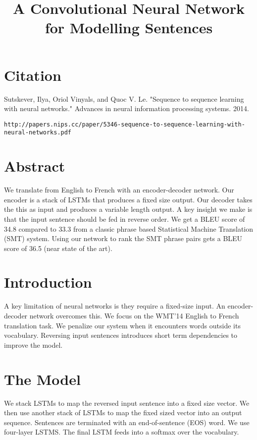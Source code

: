 \documentclass[a4paper]{article}
\title{A Convolutional Neural Network for Modelling Sentences}
\date{}
\begin{document}
\maketitle

\section{Citation}
Sutskever, Ilya, Oriol Vinyals, and Quoc V. Le. "Sequence to sequence learning with neural networks." Advances in neural information processing systems. 2014.

\begin{verbatim}
http://papers.nips.cc/paper/5346-sequence-to-sequence-learning-with-neural-networks.pdf
\end{verbatim}

\section{Abstract}
We translate from English to French with an encoder-decoder network. Our encoder
is a stack of LSTMs that produces a fixed size output. Our decoder takes
the this as input and produces a variable length output. A key insight we
make is that the input sentence should be fed in reverse order. We get a BLEU
score of 34.8 compared to 33.3 from a classic phrase based Statistical
Machine Translation (SMT) system. Using our network to rank the SMT phrase
pairs gets a BLEU score of 36.5 (near state of the art).

\section{Introduction}
A key limitation of neural networks is they require a fixed-size input. An
encoder-decoder network overcomes this. We focus on the WMT'14 English to
French translation task. We penalize our system when it encounters words
outside its vocabulary. Reversing input sentences introduces short term
dependencies to improve the model.

\section{The Model}
We stack LSTMs to map the reversed input sentence into a fixed size vector.
We then use another stack of LSTMs to map the fixed sized vector into an
output sequence. Sentences are terminated with an end-of-sentence (EOS) word.
We use four-layer LSTMS. The final LSTM feeds into a softmax over the
vocabulary.
\end{document}

